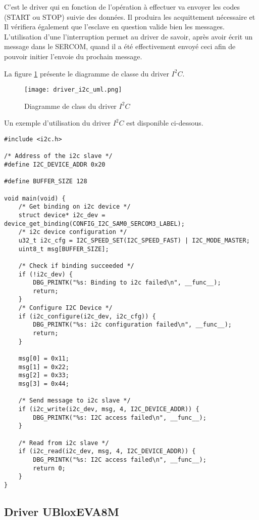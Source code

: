 C'est le driver qui en fonction de l'opération à effectuer va envoyer les codes (START ou STOP) suivie des données. Il produira les acquittement nécessaire et Il vérifiera également que l'esclave en question valide bien les messages. L'utilisation d'une l'interruption permet au driver de savoir, après avoir écrit un message dans le SERCOM, quand il a été effectivement envoyé ceci afin de pouvoir initier l'envoie du prochain message.

La figure \ref{fig:driver_i2c_uml} présente le diagramme de classe du driver $I^{2}C$.

\begin{figure}[htb]
\centering 
\texttt{[image: driver\_i2c\_uml.png]} 
\caption{Diagramme de class du driver $I^{2}C$}
\label{fig:driver_i2c_uml}
\end{figure}

Un exemple d'utilisation du driver $I^{2}C$ est disponible ci-dessous.

\begin{lstlisting}[style=CStyle]
#include <i2c.h>

/* Address of the i2c slave */
#define I2C_DEVICE_ADDR 0x20

#define BUFFER_SIZE 128

void main(void) {
	/* Get binding on i2c device */
	struct device* i2c_dev = device_get_binding(CONFIG_I2C_SAM0_SERCOM3_LABEL);
	/* i2c device configuration */
	u32_t i2c_cfg = I2C_SPEED_SET(I2C_SPEED_FAST) | I2C_MODE_MASTER;
	uint8_t msg[BUFFER_SIZE];
	
	/* Check if binding succeeded */
	if (!i2c_dev) {
		DBG_PRINTK("%s: Binding to i2c failed\n", __func__);
		return;
	}
	/* Configure I2C Device */
	if (i2c_configure(i2c_dev, i2c_cfg)) {
		DBG_PRINTK("%s: i2c configuration failed\n", __func__);
		return;
	}	
	
	msg[0] = 0x11;
	msg[1] = 0x22;
	msg[2] = 0x33;
	msg[3] = 0x44;	
	
	/* Send message to i2c slave */
	if (i2c_write(i2c_dev, msg, 4, I2C_DEVICE_ADDR)) {
		DBG_PRINTK("%s: I2C access failed\n", __func__);
	}
	
	/* Read from i2c slave */
	if (i2c_read(i2c_dev, msg, 4, I2C_DEVICE_ADDR)) {
		DBG_PRINTK("%s: I2C access failed\n", __func__);
		return 0;
	}	
}
\end{lstlisting}

\subsection{Driver UBloxEVA8M}

